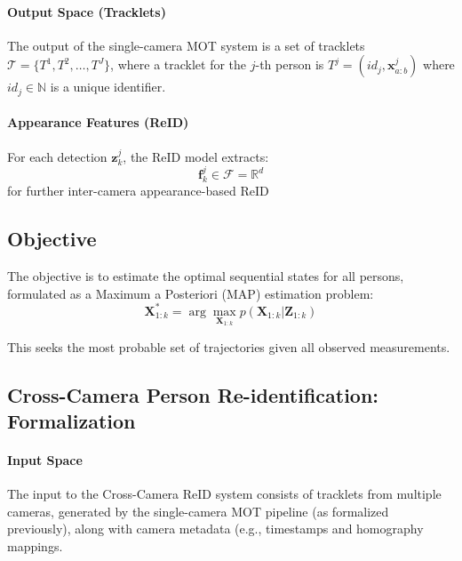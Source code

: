\documentclass[12pt, a4paper]{article}
\begin{document}
\paragraph{Output Space (Tracklets)}
The output of the single-camera MOT system is a set of tracklets \textbf{$\mathcal{T} = \{ T^1, T^2, \ldots, T^J \}$}, where a tracklet for the $j$-th person is $ T^j = (id_j, \mathbf{x}_{a:b}^j) $ where $id_j \in \mathbb{N}$ is a unique identifier.


\paragraph{Appearance Features (ReID)}
For each detection $\mathbf{z}_k^j$, the ReID model extracts:
    \[
    \mathbf{f}_k^j \in \mathcal{F} = \mathbb{R}^d
    \]
    for further inter-camera appearance-based ReID

\subsection{Objective}
The objective is to estimate the optimal sequential states for all persons, formulated as a Maximum a Posteriori (MAP) estimation problem: 
\[
\mathbf{X}_{1:k}^* = \arg\max_{\mathbf{X}_{1:k}} p(\mathbf{X}_{1:k} | \mathbf{Z}_{1:k})
\]

 This seeks the most probable set of trajectories given all observed measurements.
 
 
 \subsection{Cross-Camera Person Re-identification: Formalization}
 
 \paragraph{Input Space} The input to the Cross-Camera ReID system consists of tracklets from multiple cameras, generated by the single-camera MOT pipeline (as formalized previously), along with camera metadata (e.g., timestamps and homography mappings.
 
\end{document}

